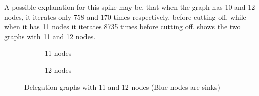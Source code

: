 A possible explanation for this spike may be, that when the graph has 10 and 12 nodes, it iterates only 758 and 170 times respectively, before cutting off, while when it has 11 nodes it iterates 8735 times before cutting off.  shows the two graphs with 11 and 12 nodes.

\begin{figure}[h]
    \centering
    \begin{subfigure}[t]{0.45\textwidth}
        \centering
        \caption{11 nodes}
        \label{subfig:random-11and12-11}
    \end{subfigure}
    \hfill
    \begin{subfigure}[t]{0.45\textwidth}
        \centering
        \caption{12 nodes}
    \end{subfigure}
    \caption{Delegation graphs with 11 and 12 nodes (Blue nodes are sinks)}
    \label{fig:random-11and12}
\end{figure}

